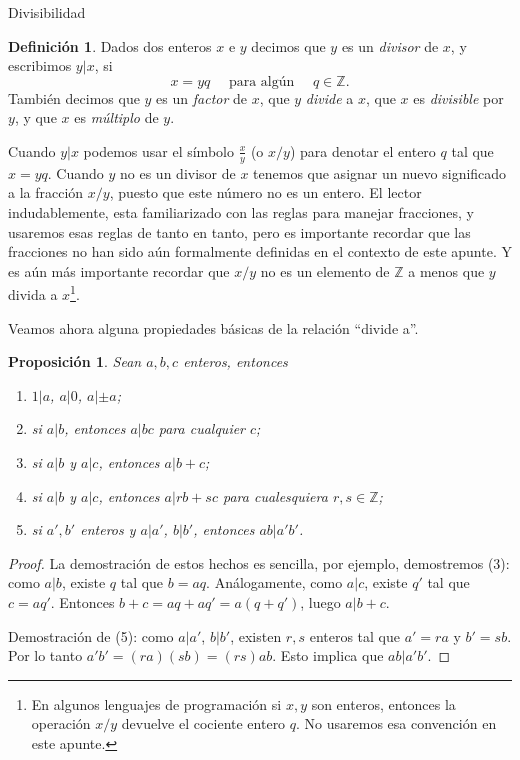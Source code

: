 \documentclass[11pt,spanish,makeidx]{amsbook}
\newtheorem{proposicion}[teorema]{Proposici\'on}
\theoremstyle{definition}
\newtheorem{definicion}{Definici\'on}[section]
\theoremstyle{remark}
\begin{document}
\begin{section}{Divisibilidad}\label{1.6}

\begin{definicion}Dados dos enteros $x$ e $y$ decimos que $y$ es un {\em divisor} de $x$, y escribimos $y|x$, si
$$
x=yq\quad\text{ para algún }\quad q\in \mathbb Z.
$$
También decimos que $y$ es un {\em factor} de $x$, que $y$ {\em divide} a $x$, que $x$ es {\em divisible} por $y$, y que $x$ es {\em múltiplo} de $y$.
\end{definicion}

Cuando $y|x$ podemos usar el símbolo $\frac{x}{y}$ (o $x/y$) para denotar el entero $q$ tal que $ x=yq$. Cuando $y$ no es un divisor de $x$ tenemos que asignar un nuevo significado a la fracción $x/y$, puesto que este número no es un entero. El lector indudablemente, esta familiarizado con las reglas para manejar fracciones, y usaremos esas reglas de tanto en tanto, pero es importante recordar que las fracciones no han sido aún formalmente definidas en el contexto de este apunte. Y es aún más importante recordar que $x/y$ no es un elemento de $\mathbb Z$ a menos que $y$ divida a $x$\footnote{En algunos lenguajes de programación si $x,y$ son enteros, entonces la operación $x/y$ devuelve el cociente entero $q$. No usaremos esa convención en este apunte.}.

Veamos ahora alguna propiedades básicas de la relación ``divide a''. 

\begin{proposicion}Sean $a,b,c$ enteros, entonces
\begin{enumerate}
\item $1|a$, $a|0$, $a|\pm a$;
\item si $a|b$, entonces $a|bc$ para cualquier $c$;
\item si $a|b$ y $a|c$, entonces $a|b+c$;
\item si $a|b$ y $a|c$, entonces $a|rb+sc$ para cualesquiera $r,s \in \mathbb Z$;
\item si $a',b'$ enteros y $a|a'$, $b|b'$, entonces $ab|a'b'$.
\end{enumerate}
\end{proposicion}
\begin{proof}
	La demostración de estos hechos es sencilla, por ejemplo, demostremos (3): como $a|b$, existe $q$ tal que $b = aq$. Análogamente, como $a|c$, existe $q'$ tal que $c = aq'$. Entonces $b+c = aq+aq' = a(q+q')$, luego $a|b+c$.  

	Demostración de (5): como $a|a'$, $b|b'$, existen $r,s$ enteros tal que $a'=ra$ y $b' =sb$. Por lo tanto $a'b' = (ra)(sb) = (rs)ab$. Esto implica que  $ab|a'b'$.


\end{proof}
\end{section}
\end{document}
